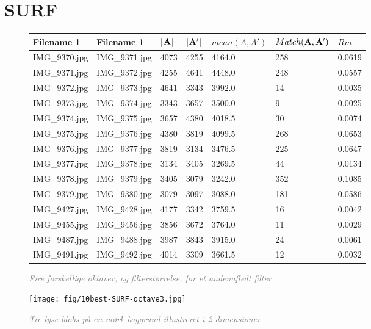 \section{SURF}

\begin{figure}[H]
    \centering
    \begin{center}    
    \begin{tabular}{ | l | l | l | l | l | l | l |}
    \hline
    Filename 1 & Filename 1 & |$\bold{A}$| & |$\bold{A'}$| & $mean(A,A')$ & $Match(\bold{A}, \bold{A}')$ & $Rm$ \\ \hline
IMG\_9370.jpg &	IMG\_9371.jpg &	4073 &	4255 &	4164.0 &	258 &	0.0619\\ \hline
IMG\_9371.jpg &	IMG\_9372.jpg &	4255 &	4641 &	4448.0 &	248 &	0.0557\\ \hline
IMG\_9372.jpg &	IMG\_9373.jpg &	4641 &	3343 &	3992.0 &	14 &	0.0035\\ \hline
IMG\_9373.jpg &	IMG\_9374.jpg &	3343 &	3657 &	3500.0 &	9 &		0.0025\\ \hline
IMG\_9374.jpg &	IMG\_9375.jpg &	3657 &	4380 &	4018.5 &	30 &	0.0074\\ \hline
IMG\_9375.jpg &	IMG\_9376.jpg &	4380 &	3819 &	4099.5 &	268 &	0.0653\\ \hline
IMG\_9376.jpg &	IMG\_9377.jpg &	3819 &	3134 &	3476.5 &	225 &	0.0647\\ \hline
IMG\_9377.jpg &	IMG\_9378.jpg &	3134 &	3405 &	3269.5 &	44 &	0.0134\\ \hline
IMG\_9378.jpg &	IMG\_9379.jpg &	3405 &	3079 &	3242.0 &	352 &	0.1085\\ \hline
IMG\_9379.jpg &	IMG\_9380.jpg &	3079 &	3097 &	3088.0 &	181 &	0.0586\\ \hline
IMG\_9427.jpg &	IMG\_9428.jpg &	4177 &	3342 &	3759.5 &	16 &	0.0042\\ \hline
IMG\_9455.jpg &	IMG\_9456.jpg &	3856 &	3672 &	3764.0 &	11 &	0.0029\\ \hline
IMG\_9487.jpg &	IMG\_9488.jpg &	3987 &	3843 &	3915.0 &	24 &	0.0061\\ \hline
IMG\_9491.jpg &	IMG\_9492.jpg &	4014 &	3309 &	3661.5 &	12 &	0.0032\\ \hline
    \end{tabular}       
    \caption{\textcolor{gray}{\footnotesize \textit{Fire forskellige oktaver, og filterstørrelse, for et andenafledt filter}}}
    \label{tab:SURFOCTAVE2}
     \end{center}
     \vspace{-2.5em}
\end{figure} \noindent

\begin{figure}[H]
    \centering
    \texttt{[image: fig/10best-SURF-octave3.jpg]}
    \vspace{-0.5em}   
    \begin{center}
    \caption{\textcolor{gray}{\footnotesize \textit{
    Tre lyse blobs på en mørk baggrund illustreret i 2 dimensioner \cite{blob}}}}
    \label{fig:lindblob}
     \end{center}
  \end{figure}
       \vspace{-2.7em}
\noindent